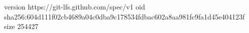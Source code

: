version https://git-lfs.github.com/spec/v1
oid sha256:604d111f02cb4689a04c0dba9c178534fdbac602a8aa981fc9fa1d45e404123f
size 254427
